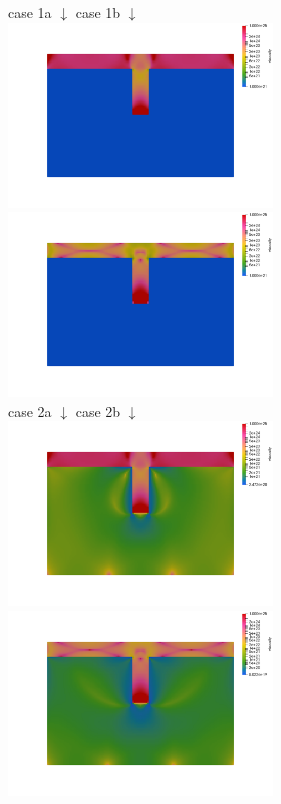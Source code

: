 \begin{center}
case 1a $\downarrow$ \hspace{7cm} case 1b $\downarrow$\\
\includegraphics[width=7cm]{python_codes/fieldstone_26/results/case1a_etaeff}
\includegraphics[width=7cm]{python_codes/fieldstone_26/results/case1b_etaeff}\\
case 2a $\downarrow$ \hspace{7cm} case 2b $\downarrow$\\
\includegraphics[width=7cm]{python_codes/fieldstone_26/results/case2a_etaeff}
\includegraphics[width=7cm]{python_codes/fieldstone_26/results/case2b_etaeff}
\end{center}




